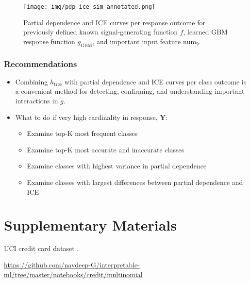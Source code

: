 \documentclass{article}
\begin{document}
\begin{figure}[!htbp]
	\begin{center}
		\texttt{[image: img/pdp\_ice\_sim\_annotated.png]}
    \caption{Partial dependence and ICE curves per response outcome for previously defined known signal-generating function $f$,  learned GBM response function $g_{\text{GBM}}$, and important input feature $\text{num}_9$.}
    \label{fig:global_pdp_ice}
	\end{center}
\end{figure}
\FloatBarrier

\subsubsection{Recommendations}

\begin{itemize}

\item Combining $h_{\text{tree}}$ with partial dependence and ICE curves per class outcome is a convenient method for detecting, confirming, and understanding important interactions in $g$.

\item What to do if very high cardinality in response, $\mathbf{Y}$:

\begin{itemize}

  \item Examine top-K most frequent classes
  \item Examine top-K most accurate and inaccurate classes
  \item Examine classes with highest variance in partial dependence
  \item Examine classes with largest differences between partial dependence and ICE
  
\end{itemize}

\end{itemize}

\section{Supplementary Materials}


UCI credit card dataset \cite{uci}.

\begin{center}
  \url{https://github.com/navdeep-G/interpretable-ml/tree/master/notebooks/credit/multinomial}
\end{center}
\end{document}
